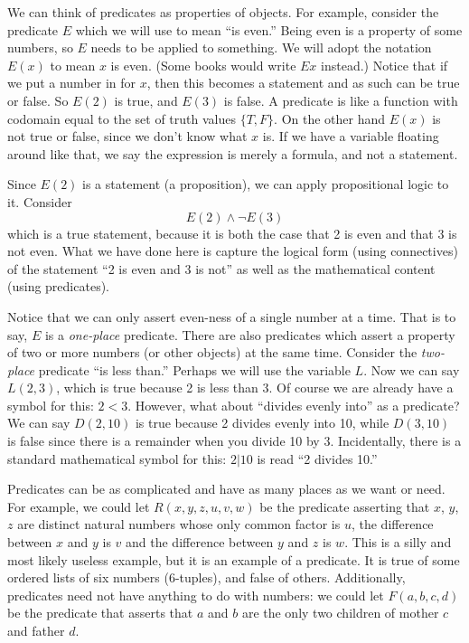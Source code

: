 \documentclass[12pt]{article}
\begin{document}
We can think of predicates as properties of objects.  For example, consider the predicate $E$ which we will use to mean ``is even.''  Being even is a property of some numbers, so $E$ needs to be applied to something.  We will adopt the notation $E(x)$ to mean $x$ is even.  (Some books would write $Ex$ instead.)  Notice that if we put a number in for $x$, then this becomes a statement and as such can be true or false.  So $E(2)$ is true, and $E(3)$ is false.  A predicate is like a function with codomain equal to the set of truth values $\{T, F\}$.  On the other hand $E(x)$ is not true or false, since we don't know what $x$ is.  If we have a variable floating around like that, we say the expression is merely a formula, and not a statement.

Since $E(2)$ is a statement (a proposition), we can apply propositional logic to it.  Consider
\[E(2) \wedge \neg E(3)\]
which is a true statement, because it is both the case that 2 is even and that 3 is not even.  What we have done here is capture the logical form (using connectives) of the statement ``2 is even and 3 is not'' as well as the mathematical content (using predicates).

Notice that we can only assert even-ness of a single number at a time.  That is to say, $E$ is a {\em one-place} predicate.  There are also predicates which assert a property of two or more numbers (or other objects) at the same time.  Consider the {\em two-place} predicate ``is less than.''  Perhaps we will use the variable $L$.  Now we can say $L(2,3)$, which is true because 2 is less than 3.  Of course we are already have a symbol for this: $2 < 3$.  However, what about ``divides evenly into'' as a predicate?  We can say $D(2,10)$ is true because 2 divides evenly into 10, while $D(3, 10)$ is false since there is a remainder when you divide 10 by 3.  Incidentally, there is a standard mathematical symbol for this: $2 | 10$ is read ``2 divides 10.''

Predicates can be as complicated and have as many places as we want or need.  For example, we could let $R(x,y,z,u,v,w)$ be the predicate asserting that $x$, $y$, $z$ are distinct natural numbers whose only common factor is $u$, the difference between $x$ and $y$ is $v$ and the difference between $y$ and $z$ is $w$.  This is a silly and most likely useless example, but it is an example of a predicate.  It is true of some ordered lists of six numbers (6-tuples), and false of others.  Additionally, predicates need not have anything to do with numbers: we could let $F(a,b,c,d)$ be the predicate that asserts that $a$ and $b$ are the only two children of mother $c$ and father $d$.
\end{document}
